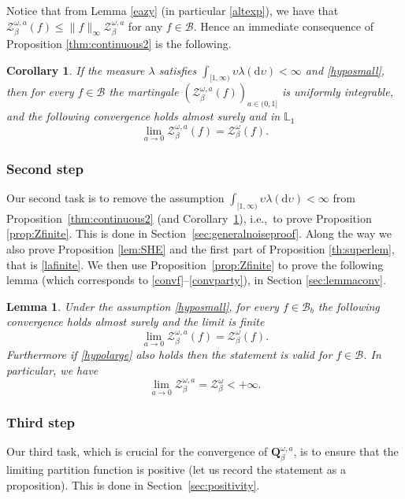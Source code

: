 \documentclass[11pt]{article}
\newcommand{\ie}{i.e.,\xspace}
\numberwithin{equation}{section}
\let\mathcal\mathscr
\newtheorem{lemma}[theorem]{Lemma}
\newtheorem{cor}[theorem]{Corollary}
\theoremstyle{definition}
\newcommand{\dd}{\mathrm{d}}
\newcommand{\cB}{{\ensuremath{\mathcal B}} }
\newcommand{\cZ}{{\ensuremath{\mathcal Z}} }
\newcommand{\bQ}{{\ensuremath{\mathbf Q}} }
\newcommand{\bbL}{{\ensuremath{\mathbb L}} }
\let\gl\lambda
\let\ups\upsilon
\let\go\omega
\begin{document}
 Notice that from Lemma \ref{eazy} (in particular \eqref{altexp}),
we have that
$\cZ^{\go,a }_{\beta}(f)\le \|f\|_{\infty} \cZ^{\go,a }_{\beta}$ for any $f\in \cB$. Hence an immediate consequence of
Proposition \ref{thm:continuous2} is the following.

\begin{cor}\label{toutlesf}
If the measure $\gl$ satisfies $\int_{[1,\infty)} \ups \gl(\dd \ups)<\infty$ and \eqref{hyposmall}, then for every $f\in \cB$ the martingale
$(\cZ^{\go,a }_{\beta}(f))_{a\in(0,1]}$ is uniformly integrable, and
the following convergence holds almost surely and in $\bbL_1$
\begin{equation*}
\lim_{a \to 0}\cZ^{\go,a }_{\beta}(f)=\cZ^{\go }_{ \beta}(f).
\end{equation*}
\end{cor}

\subsubsection*{Second step} Our second task is to remove the assumption $\int_{[1,\infty)} \ups \gl(\dd \ups)<\infty$ from Proposition~\ref{thm:continuous2} (and Corollary~\ref{toutlesf}), \ie \ to prove Proposition \ref{prop:Zfinite}. This is done in Section~\ref{sec:generalnoiseproof}. Along the way we also prove Proposition \ref{lem:SHE} and the first part of Proposition \ref{th:superlem}, that is \eqref{lafinite}.
We then use Proposition~\ref{prop:Zfinite} to prove the following lemma (which corresponds to \eqref{convf}--\eqref{convparty}), in Section \ref{sec:lemmaconv}.

\begin{lemma}\label{lemmaconv}
Under the assumption \eqref{hyposmall}, for every $f\in \cB_b$
the following convergence holds almost surely and the limit is finite
\begin{equation*}
\lim_{a \to 0}\cZ^{\go,a }_{\beta}(f)=\cZ^{\go }_{ \beta}(f).
\end{equation*}
Furthermore if \eqref{hypolarge} also holds then the statement is valid for $f\in \mathcal B$. In particular, we have
\begin{equation}
\label{eq:lemmaconv}
\lim_{a \to 0}\cZ^{\go,a }_{\beta}=\cZ^{\go }_{ \beta} <+\infty.
\end{equation}
\end{lemma}

\subsubsection*{Third step} Our third task, which is crucial for the convergence of $\bQ^{\go,a}_{\beta}$, is to ensure that the limiting partition function is positive (let us record the statement as a proposition).
This is done in Section~\ref{sec:positivity}.
\end{document}
